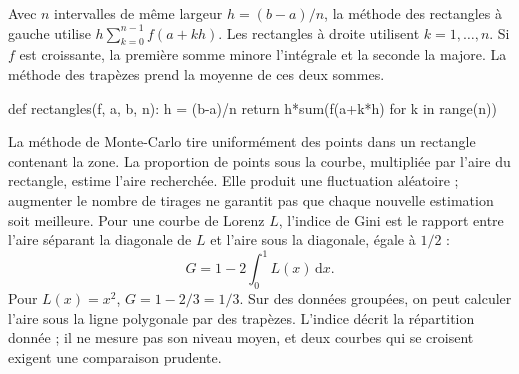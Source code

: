 Avec $n$ intervalles de même largeur $h=(b-a)/n$, la méthode des rectangles à gauche utilise $h\sum_{k=0}^{n-1}f(a+kh)$.
Les rectangles à droite utilisent $k=1,\ldots,n$. Si $f$ est croissante, la première somme minore l'intégrale et la seconde la majore.
La méthode des trapèzes prend la moyenne de ces deux sommes.
\begin{python}
def rectangles(f, a, b, n):
    h = (b-a)/n
    return h*sum(f(a+k*h) for k in range(n))
\end{python}
La méthode de Monte-Carlo tire uniformément des points dans un rectangle contenant la zone. La proportion de points sous la courbe, multipliée par l'aire du rectangle, estime l'aire recherchée. Elle produit une fluctuation aléatoire ; augmenter le nombre de tirages ne garantit pas que chaque nouvelle estimation soit meilleure.
Pour une courbe de Lorenz $L$, l'indice de Gini est le rapport entre l'aire séparant la diagonale de $L$ et l'aire sous la diagonale, égale à $1/2$ :
\[G=1-2\int_0^1L(x)\,\mathrm dx.\]
Pour $L(x)=x^2$, $G=1-2/3=1/3$.
Sur des données groupées, on peut calculer l'aire sous la ligne polygonale par des trapèzes. L'indice décrit la répartition donnée ; il ne mesure pas son niveau moyen, et deux courbes qui se croisent exigent une comparaison prudente.

